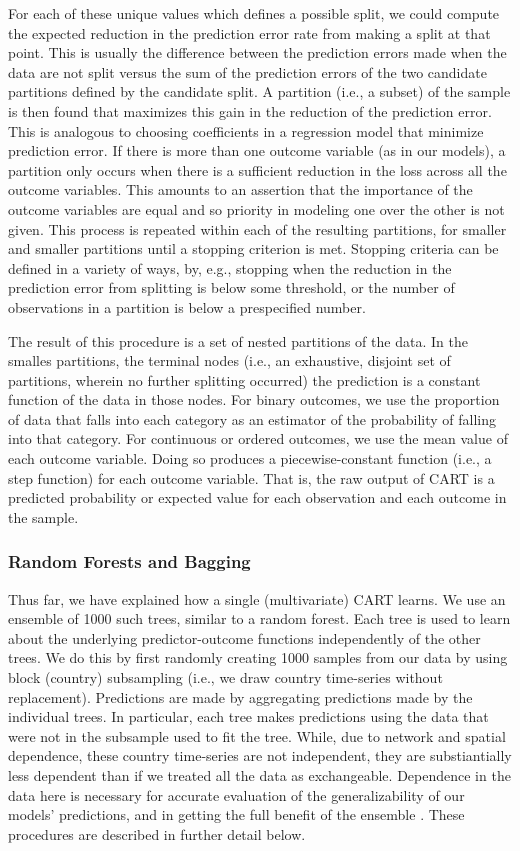 \documentclass[titlepage, onecolumn,12pt]{article}
\begin{document}
For each of these unique values which defines a possible split, we could compute the expected reduction in the prediction error rate from making a split at that point. This is usually the difference between the prediction errors made when the data are not split versus the sum of the prediction errors of the two candidate partitions defined by the candidate split. A partition (i.e., a subset) of the sample is then found that maximizes this gain in the reduction of the prediction error. This is analogous to choosing coefficients in a regression model that minimize prediction error. If there is more than one outcome variable (as in our models), a partition only occurs when there is a sufficient reduction in the loss across all the outcome variables. This amounts to an assertion that the importance of the outcome variables are equal and so priority in modeling one over the other is not given. This process is repeated within each of the resulting partitions, for smaller and smaller partitions until a stopping criterion is met. Stopping criteria can be defined in a variety of ways, by, e.g., stopping when the reduction in the prediction error from splitting is below some threshold, or the number of observations in a partition is below a prespecified number.

The result of this procedure is a set of nested partitions of the data. In the smalles partitions, the terminal nodes (i.e., an exhaustive, disjoint set of partitions, wherein no further splitting occurred) the prediction is a constant function of the data in those nodes. For binary outcomes, we use the proportion of data that falls into each category as an estimator of the probability of falling into that category. For continuous or ordered outcomes, we use the mean value of each outcome variable. Doing so produces a piecewise-constant function (i.e., a step function) for each outcome variable.  That is, the raw output of CART is a predicted probability or expected value for each observation and each outcome in the sample.

\subsubsection{Random Forests and Bagging}

Thus far, we have explained how a single (multivariate) CART learns. We use an ensemble of 1000 such trees, similar to a random forest. Each tree is used to learn about the underlying predictor-outcome functions independently of the other trees. We do this by first randomly creating 1000 samples from our data by using block (country) subsampling (i.e., we draw country time-series without replacement). Predictions are made by aggregating predictions made by the individual trees. In particular, each tree makes predictions using the data that were not in the subsample used to fit the tree. While, due to network and spatial dependence, these country time-series are not independent, they are substiantially less dependent than if we treated all the data as exchangeable. Dependence in the data here is necessary for accurate evaluation of the generalizability of our models' predictions, and in getting the full benefit of the ensemble \citep{breiman2001random}. These procedures are described in further detail below.
\end{document}
